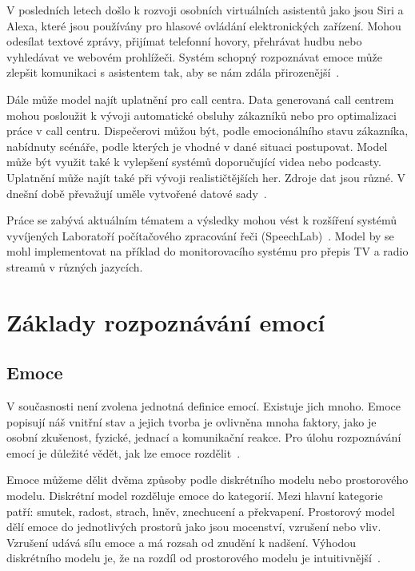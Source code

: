 \documentclass[FM,BP]{tulthesis}
\begin{document}
V posledních letech došlo k rozvoji osobních virtuálních asistentů jako jsou Siri a Alexa, které jsou používány pro hlasové ovládání elektronických zařízení. Mohou odesílat textové zprávy, přijímat telefonní hovory, přehrávat hudbu nebo vyhledávat ve webovém prohlížeči. Systém schopný rozpoznávat emoce může zlepšit komunikaci s asistentem tak, aby se nám zdála přirozenější~\cite{DBLP:journals/corr/abs-1912-10458}.

Dále může model najít uplatnění pro call centra. Data generovaná call centrem mohou posloužit k vývoji automatické obsluhy zákazníků nebo pro optimalizaci práce v call centru. Dispečerovi můžou být, podle emocionálního stavu zákazníka, nabídnuty scénáře, podle kterých je vhodné v dané situaci postupovat. Model může být využit také k vylepšení systémů doporučující videa nebo podcasty. Uplatnění může najít také při vývoji realističtějších her. Zdroje dat jsou různé. V dnešní době převažují uměle vytvořené datové sady~\cite{konar_chakraborty_2015}.

Práce se zabývá aktuálním tématem a výsledky mohou vést k rozšíření systémů vyvíjených Laboratoří počítačového zpracování řeči (SpeechLab)~\cite{speechlab}. Model by se mohl implementovat na příklad do monitorovacího systému pro přepis TV a radio streamů v různých jazycích.

\chapter{Základy rozpoznávání emocí}

\section{Emoce} %
V současnosti není zvolena jednotná definice emocí. Existuje jich mnoho. Emoce popisují náš vnitřní stav a jejich tvorba je ovlivněna mnoha faktory, jako je osobní zkušenost, fyzické, jednací a komunikační reakce. Pro úlohu rozpoznávání emocí je důležité vědět, jak lze emoce rozdělit~\cite{DBLP:journals/speech/AkcayO20}.

Emoce můžeme dělit dvěma způsoby podle diskrétního modelu nebo prostorového modelu. Diskrétní model rozděluje emoce do kategorií. Mezi hlavní kategorie patří: smutek, radost, strach, hněv, znechucení a překvapení. Prostorový model dělí emoce do jednotlivých prostorů jako jsou mocenství, vzrušení nebo vliv. Vzrušení udává sílu emoce a má rozsah od znudění k nadšení. Výhodou diskrétního modelu je, že na rozdíl od prostorového modelu je intuitivnější~\cite{DBLP:journals/speech/AkcayO20}.
\end{document}
